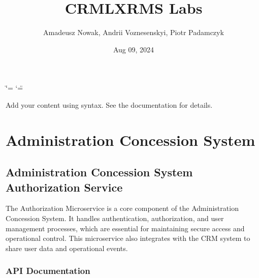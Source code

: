 \documentclass[letterpaper,10pt,english]{sphinxmanual}
\title{CRMLXRMS Labs}
\date{Aug 09, 2024}
\author{Amadeusz Nowak, Andrii Voznesenskyi, Piotr Padamczyk}
\begin{document}
\ifdefined\shorthandoff
  \ifnum\catcode`\=\string=\active\shorthandoff{=}\fi
  \ifnum\catcode`\"=\active{}\fi
\fi

\pagestyle{empty}
\sphinxmaketitle
\pagestyle{plain}
\sphinxtableofcontents
\pagestyle{normal}
\label{\detokenize{index::doc}}


\sphinxAtStartPar
Add your content using  syntax. See the
documentation for details.

\sphinxstepscope


\chapter{Administration Concession System}
\label{\detokenize{administration_concession_system/index:administration-concession-system}}\label{\detokenize{administration_concession_system/index::doc}}
\sphinxstepscope


\section{Administration Concession System Authorization Service}
\label{\detokenize{administration_concession_system/authorization_service:administration-concession-system-authorization-service}}\label{\detokenize{administration_concession_system/authorization_service::doc}}
\sphinxAtStartPar
The Authorization Microservice is a core component of the Administration Concession System. It handles authentication, authorization, and user management processes, which are essential for maintaining secure access and operational control. This microservice also integrates with the CRM system to share user data and operational events.



\subsection{API Documentation}
\label{\detokenize{administration_concession_system/authorization_service:api-documentation}}
\end{document}

